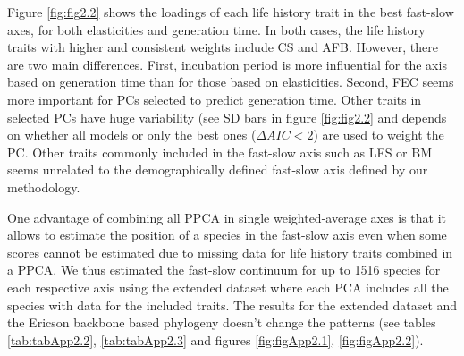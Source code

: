 Figure \ref{fig:fig2.2} shows the loadings of each life history trait in the 
best fast-slow axes, for both elasticities and generation time. In both cases,
the life history traits with higher and consistent weights include CS and AFB.
However, there are two main differences. First, incubation period is more 
influential for the axis based on generation time than for those based on 
elasticities. Second, FEC seems more important for PCs selected to 
predict generation time. Other traits in selected PCs have huge variability 
(see SD bars in figure \ref{fig:fig2.2} and depends on whether all models or 
only the best ones ($\Delta AIC < 2$) are used to weight the PC. Other traits 
commonly included in the fast-slow axis such as LFS or BM seems unrelated to 
the demographically defined fast-slow axis defined by our methodology.

One advantage of combining all PPCA in single weighted-average axes is that it 
allows to estimate the position of a species in the fast-slow axis even when
some scores cannot be estimated due to missing data for life history traits
combined in a PPCA. We thus estimated the fast-slow continuum for up to 1516
species for each respective axis using the extended dataset where each PCA
includes all the species with data for the included traits. The results for the
extended dataset and the Ericson backbone based phylogeny doesn't change the
patterns (see tables \ref{tab:tabApp2.2}, \ref{tab:tabApp2.3} and figures
\ref{fig:figApp2.1}, \ref{fig:figApp2.2}).

